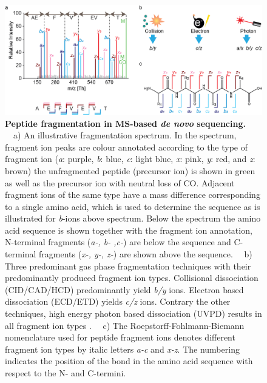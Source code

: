 \begin{figure}[!htb]
  \center
  \includegraphics[]{Chapter.1/Figures/f4.png}
  \caption{
    \textbf{Peptide fragmentation in MS-based \emph{de novo} sequencing.} ~~a) An illustrative fragmentation spectrum. In the spectrum, fragment ion peaks are colour annotated according to the type of fragment ion (\emph{a}: purple, \emph{b}: blue, \emph{c}: light blue, \emph{x}: pink, \emph{y}: red, and \emph{z}: brown) the unfragmented peptide (precursor ion) is shown in green as well as the precursor ion with neutral loss of CO. Adjacent fragment ions of the same type have a mass difference corresponding to a single amino acid, which is used to determine the sequence as is illustrated for \emph{b}-ions above spectrum. Below the spectrum the amino acid sequence is shown together with the fragment ion annotation, N-terminal fragments (\emph{a-, b- ,c-}) are below the sequence and C-terminal fragments (\emph{x-, y-, z-}) are shown above the sequence. ~~b) Three predominant gas phase fragmentation techniques with their predominantly produced fragment ion types. Collisional dissociation (CID/CAD/HCD) predominantly yield \emph{b/y} ions. Electron based dissociation (ECD/ETD) yields \emph{c/z} ions. Contrary the other techniques, high energy photon based dissociation (UVPD) results in all fragment ion types \cite{brodbelt2016ion}. ~~c) The Roepstorff-Fohlmann-Biemann nomenclature used for peptide fragment ions denotes different fragment ion types by italic letters \emph{a-c} and \emph{x-z}. The numbering indicates the position of the bond in the amino acid sequence with respect to the N- and C-termini.
  }
  \label{fig:fig1.4}
\end{figure}
